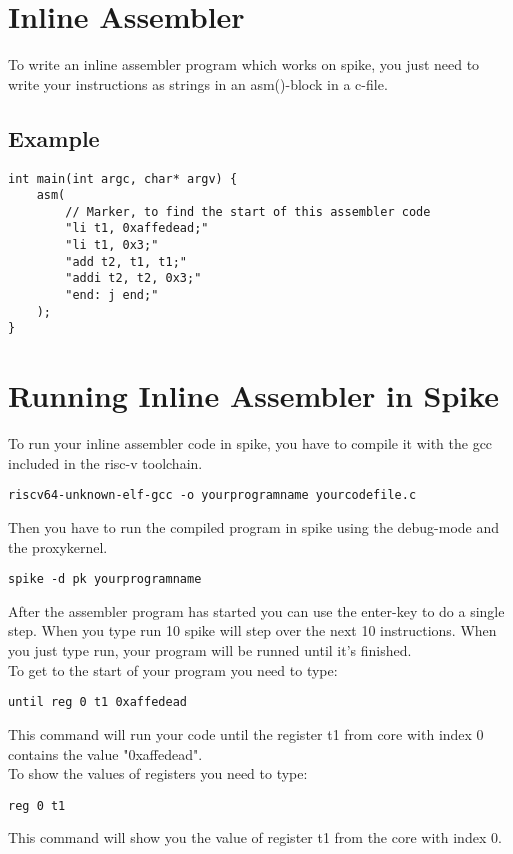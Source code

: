 \documentclass[a4paper, oneside]{scrreprt}
\author{Andre Brand}
\begin{document}
\chapter{Inline Assembler}
To write an inline assembler program which works on spike, you just need to write your instructions as strings in an asm()-block in a c-file.
\\
\section{Example}
\begin{lstlisting}
int main(int argc, char* argv) {
	asm(
		// Marker, to find the start of this assembler code
		"li t1, 0xaffedead;"
		"li t1, 0x3;"
		"add t2, t1, t1;"
		"addi t2, t2, 0x3;"
		"end: j end;"
	);
}
\end{lstlisting}

\chapter{Running Inline Assembler in Spike}
To run your inline assembler code in spike, you have to compile it with the gcc included in the risc-v toolchain.\\
\begin{lstlisting}
riscv64-unknown-elf-gcc -o yourprogramname yourcodefile.c
\end{lstlisting}
Then you have to run the compiled program in spike using the debug-mode and the proxykernel.\\
\begin{lstlisting}
spike -d pk yourprogramname
\end{lstlisting}
After the assembler program has started you can use the enter-key to do a single step. When you type run 10 spike will step over the next 10 instructions. When you just type run, your program will be runned until it's finished.
\\
To get to the start of your program you need to type:
\begin{lstlisting}
until reg 0 t1 0xaffedead
\end{lstlisting}

This command will run your code until the register t1 from core with index 0 contains the value "0xaffedead".
\\
To show the values of registers you need to type:
\begin{lstlisting}
reg 0 t1
\end{lstlisting}

This command will show you the value of register t1 from the core with index 0.
\end{document}
